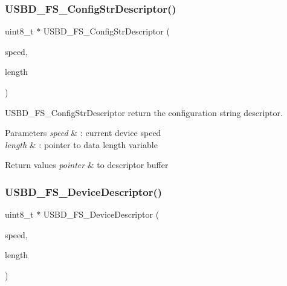 \subsubsection{\texorpdfstring{U\+S\+B\+D\+\_\+\+F\+S\+\_\+\+Config\+Str\+Descriptor()}{USBD\_FS\_ConfigStrDescriptor()}}
{\footnotesize\ttfamily uint8\+\_\+t $\ast$ U\+S\+B\+D\+\_\+\+F\+S\+\_\+\+Config\+Str\+Descriptor (\begin{DoxyParamCaption}\item[{U\+S\+B\+D\+\_\+\+Speed\+Type\+Def}]{speed,  }\item[{uint16\+\_\+t $\ast$}]{length }\end{DoxyParamCaption})}



U\+S\+B\+D\+\_\+\+F\+S\+\_\+\+Config\+Str\+Descriptor return the configuration string descriptor. 


\begin{DoxyParams}{Parameters}
{\em speed} & \+: current device speed \\
\hline
{\em length} & \+: pointer to data length variable \\
\hline
\end{DoxyParams}

\begin{DoxyRetVals}{Return values}
{\em pointer} & to descriptor buffer \\
\hline
\end{DoxyRetVals}
\hypertarget{group___u_s_b_d___d_e_s_c___private___functions_ga14798be38c08a37163e53167032485ff}{}\label{group___u_s_b_d___d_e_s_c___private___functions_ga14798be38c08a37163e53167032485ff} 
\subsubsection{\texorpdfstring{U\+S\+B\+D\+\_\+\+F\+S\+\_\+\+Device\+Descriptor()}{USBD\_FS\_DeviceDescriptor()}}
{\footnotesize\ttfamily uint8\+\_\+t $\ast$ U\+S\+B\+D\+\_\+\+F\+S\+\_\+\+Device\+Descriptor (\begin{DoxyParamCaption}\item[{U\+S\+B\+D\+\_\+\+Speed\+Type\+Def}]{speed,  }\item[{uint16\+\_\+t $\ast$}]{length }\end{DoxyParamCaption})}



